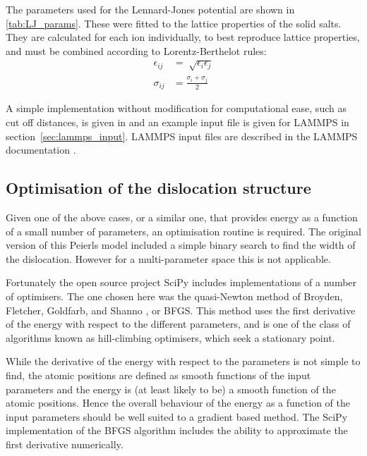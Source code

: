 The parameters used for the Lennard-Jones potential are shown in \autoref{tab:LJ_params}. These were fitted to the lattice properties of the solid salts. They are calculated for each ion individually, to best reproduce lattice properties, and must be combined according to Lorentz-Berthelot rules:
\begin{align}
\epsilon_{ij} &= \sqrt[]{\epsilon_i \epsilon_j} \nonumber\\
\sigma_{ij} &= \frac{\sigma_i + \sigma_j}{2}
\end{align}

A simple implementation without modification for computational ease, such as cut off distances, is given in \cite{code} and an example input file is given for LAMMPS in section~\ref{sec:lammps_input}. LAMMPS  input files are described in the LAMMPS documentation \cite{LAMMPS_web}.

\subsection{Optimisation of the dislocation structure}
\label{sec:optimisers}


Given one of the above cases, or a similar one, that provides energy as a function of a small number of parameters, an optimisation routine is required. The original version of this Peierls model \cite{Clegg2006} included a simple binary search to find the width of the dislocation. However for a multi-parameter space this is not applicable.

Fortunately the open source project SciPy includes implementations of a number of optimisers. The one chosen here was the quasi-Newton method of Broyden, Fletcher, Goldfarb, and Shanno \citep{SciPy2001,nocedal2006}, or BFGS. This method uses the first derivative of the energy with respect to the different parameters, and is one of the class of algorithms known as hill-climbing optimisers, which seek a stationary point.

While the derivative of the energy with respect to the parameters is not simple to find, the atomic positions are defined as smooth functions of the input parameters and the energy is (at least likely to be) a smooth function of the atomic positions. Hence the overall behaviour of the energy as a function of the input parameters should be well suited to a gradient based method. The SciPy implementation of the BFGS algorithm includes the ability to approximate the first derivative numerically.


